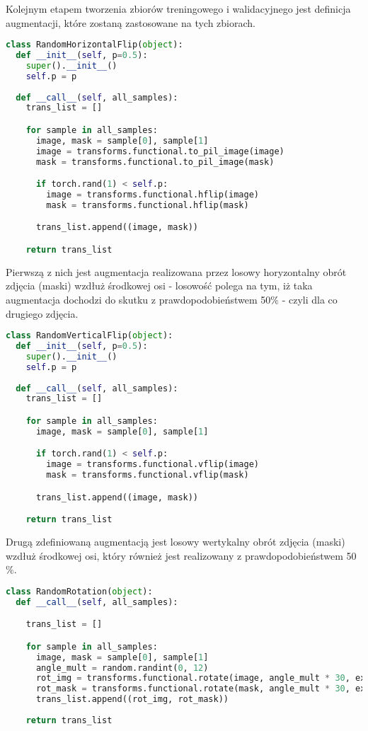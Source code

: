 \cell
Kolejnym etapem tworzenia zbiorów treningowego i walidacyjnego jest definicja augmentacji, które zostaną zastosowane na tych zbiorach.

\cell
\begin{lstlisting}[name=Rozdzial3.1, language=Python]
class RandomHorizontalFlip(object):
  def __init__(self, p=0.5):
    super().__init__()
    self.p = p
  
  def __call__(self, all_samples):
    trans_list = []

    for sample in all_samples:
      image, mask = sample[0], sample[1]
      image = transforms.functional.to_pil_image(image)
      mask = transforms.functional.to_pil_image(mask)

      if torch.rand(1) < self.p:
        image = transforms.functional.hflip(image)
        mask = transforms.functional.hflip(mask)

      trans_list.append((image, mask))

    return trans_list
\end{lstlisting}


\cell
Pierwszą z nich jest augmentacja realizowana przez losowy horyzontalny obrót zdjęcia (maski) wzdłuż środkowej osi - losowość polega na tym, iż taka augmentacja dochodzi do skutku z prawdopodobieństwem 50$\%$ - czyli dla co drugiego zdjęcia.

\cell
\begin{lstlisting}[name=Rozdzial3.1, language=Python]
class RandomVerticalFlip(object):
  def __init__(self, p=0.5):
    super().__init__()
    self.p = p
  
  def __call__(self, all_samples):
    trans_list = []

    for sample in all_samples:
      image, mask = sample[0], sample[1]

      if torch.rand(1) < self.p:
        image = transforms.functional.vflip(image)
        mask = transforms.functional.vflip(mask)

      trans_list.append((image, mask))

    return trans_list
\end{lstlisting}


\cell
Drugą zdefiniowaną augmentacją jest losowy wertykalny obrót zdjęcia (maski) wzdłuż środkowej osi, który również jest realizowany z prawdopodobieństwem 50$\%$.

\cell
\begin{lstlisting}[name=Rozdzial3.1, language=Python]
class RandomRotation(object):
  def __call__(self, all_samples):

    trans_list = []

    for sample in all_samples:
      image, mask = sample[0], sample[1]
      angle_mult = random.randint(0, 12)
      rot_img = transforms.functional.rotate(image, angle_mult * 30, expand=True)
      rot_mask = transforms.functional.rotate(mask, angle_mult * 30, expand=True)
      trans_list.append((rot_img, rot_mask))
    
    return trans_list
\end{lstlisting}


